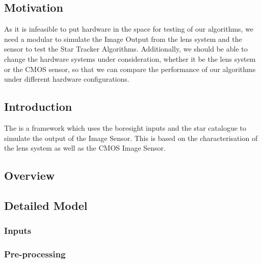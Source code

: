 \documentclass[../../main.tex]{subfiles}
\begin{document}
\subsection{Motivation}
As it is infeasible to put hardware in the space for testing of our algorithms, we need a modular \SM to simulate the Image Output from the lens system and the sensor to test the Star Tracker Algorithms. Additionally, we should be able to change the hardware systems under consideration, whether it be the lens system or the CMOS sensor, so that we can compare the performance of our algorithms under different hardware configurations. 




\subsection{Introduction} %
The \SM is a framework which uses the boresight inputs and the star catalogue to simulate the output of the Image Sensor. This is based on the characterisation of the lens system as well as the CMOS Image Sensor. 








\subsection{Overview} %
\blindtext





\subsection{Detailed Model}
\blindtext

\subsubsection{Inputs}
\blindtext

\subsubsection{Pre-processing} %
\blindtext
\end{document}
